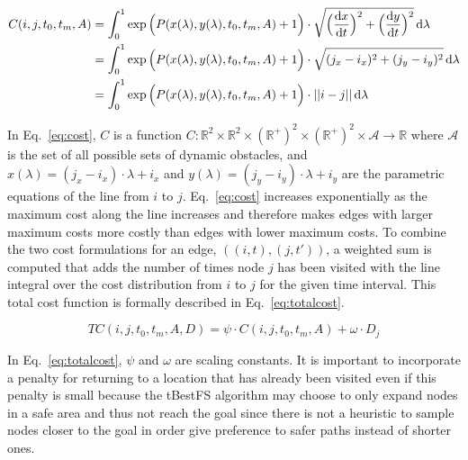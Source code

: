 \documentclass[letterpaper, 10pt, conference]{ieeeconf}
\newcommand{\dif}{\ensuremath{{\mathrm{d}}}}
\newcommand{\R}{\ensuremath{\mathbb{R}}}
\begin{document}

\begin{align}
    C(i, j, t_0, t_m, A) &= \int^1_0 \exp{\Big(
        P(x(\lambda), y(\lambda), t_0, t_m, A) + 1 \Big)
    } \cdot \sqrt{\Big(\frac{\dif x}{\dif t}\Big)^2
    + \Big(\frac{\dif y}{\dif t}\Big)^2}
    \,\mathrm{d}\lambda \notag \\
    &= \int^1_0 \exp{\Big(
        P(x(\lambda), y(\lambda), t_0, t_m, A) + 1 \Big)
    } \cdot \sqrt{(j_x - i_x)^2 + (j_y - i_y)^2}
    \,\mathrm{d}\lambda \notag \\
    &= \int^1_0 \exp{\Big(
        P(x(\lambda), y(\lambda), t_0, t_m, A) + 1 \Big)
    } \cdot ||i - j|| \,\mathrm{d}\lambda
    \label{eq:cost}
\end{align}

In Eq.~\ref{eq:cost}, $C$ is a function $C: \R^2 \times \R^2 \times (\R^+)^2
\times (\R^+)^2 \times \mathcal{A} \rightarrow \R$ where $\mathcal{A}$ is the
set of all possible sets of dynamic obstacles, and $x(\lambda) = (j_x - i_x)
\cdot \lambda + i_x$ and $y(\lambda) = (j_y - i_y) \cdot \lambda + i_y$ are the
parametric equations of the line from $i$ to $j$.  Eq.~\ref{eq:cost} increases
exponentially as the maximum cost along the line increases and therefore makes
edges with larger maximum costs more costly than edges with lower maximum
costs. To combine the two cost formulations for an edge, $((i, t), (j, t'))$, a
weighted sum is computed that adds the number of times node $j$ has been
visited with the line integral over the cost distribution from $i$ to $j$ for
the given time interval. This total cost function is formally described in
Eq.~\ref{eq:totalcost}.

\begin{equation}
    TC(i, j, t_0, t_m, A, D) = \psi \cdot C(i, j, t_0, t_m, A) +
    \omega \cdot D_j
    \label{eq:totalcost}
\end{equation}

In Eq.~\ref{eq:totalcost}, $\psi$ and $\omega$ are scaling constants. It is
important to incorporate a penalty for returning to a location that has already
been visited even if this penalty is small because the tBestFS algorithm may
choose to only expand nodes in a safe area and thus not reach the goal since
there is not a heuristic to sample nodes closer to the goal in order give
preference to safer paths instead of shorter ones.
\end{document}
